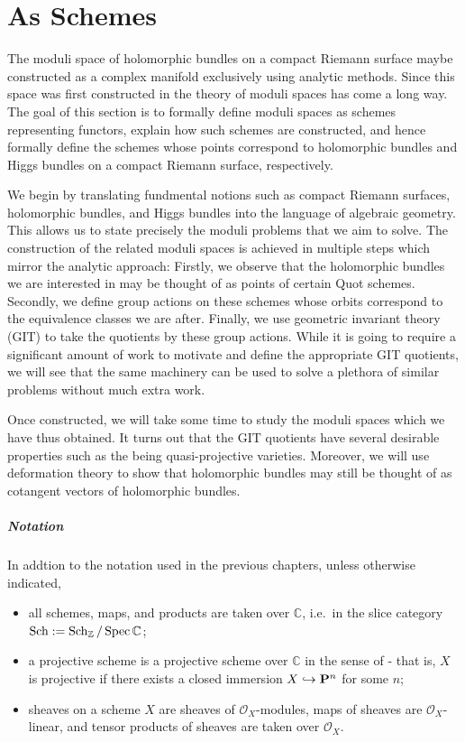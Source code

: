 \documentclass[12pt]{ociamthesis}  %
\begin{document}
\chapter{As Schemes}

The moduli space of holomorphic bundles on a compact Riemann
surface maybe constructed as a complex manifold exclusively
using analytic methods. Since this space was first constructed
in \missingcitation
the theory of moduli spaces has come a long way.
The goal of this section is to formally define moduli spaces
as schemes representing functors, explain how such schemes
are constructed, and hence formally define the schemes whose
points correspond to holomorphic bundles and Higgs bundles
on a compact Riemann surface, respectively.

We begin by translating fundmental notions such as compact
Riemann surfaces, holomorphic bundles, and Higgs bundles into
the language of algebraic geometry. This allows us to state
precisely the moduli problems that we aim to solve. The construction
of the related moduli spaces is achieved in multiple steps which
mirror the analytic approach: Firstly, we observe that the
holomorphic bundles we are interested in may be thought of as
points of certain Quot schemes. Secondly, we define group
actions on these schemes whose orbits correspond to the
equivalence classes we are after. Finally, we use geometric
invariant theory (GIT) to take the quotients by these group
actions. While it is going to require a significant amount of
work to motivate and define the appropriate GIT quotients,
we will see that the same machinery can be used to solve
a plethora of similar problems without much extra work.

Once constructed, we will take some time to study the moduli
spaces which we have thus obtained. It turns out that the GIT
quotients have several desirable properties such as the being
quasi-projective varieties. Moreover, we will use deformation
theory to show that holomorphic bundles may still be thought
of as cotangent vectors of holomorphic bundles.

\paragraph*{Notation}

In addtion to the notation used in the previous chapters, unless
otherwise indicated,
\begin{itemize}
  \item all schemes, maps, and products are taken over $\mathbb{C}$,
        i.e.~in the slice category
        $\operatorname{Sch} := \operatorname{Sch}_{\mathbb{Z}}/\operatorname{Spec}\mathbb{C}$;
  \item a projective scheme is a projective scheme over $\mathbb{C}$
        in the sense of \cite{hartshorne1977} - that is, $X$ is projective
        if there exists a closed immersion $X\hookrightarrow\mathbf{P}^{n}_{}$ for
        some $n$;
  \item sheaves on a scheme $X$ are sheaves of $\mathscr O_X$-modules,
        maps of sheaves are $\mathscr O_X$-linear, and tensor products
        of sheaves are taken over $\mathscr O_X$.
\end{itemize}
\end{document}
